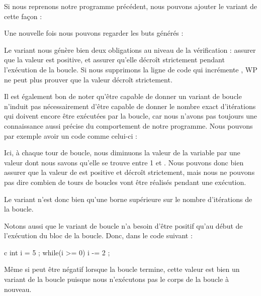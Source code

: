Si nous reprenons notre programme précédent, nous pouvons ajouter le variant
de cette façon :






Une nouvelle fois nous pouvons regarder les buts générés :





Le variant nous génère bien deux obligations au niveau de la vérification :
assurer que la valeur est positive, et assurer qu'elle décroît strictement pendant
l'exécution de la boucle. Si nous supprimons la ligne de code qui incrémente
, WP ne peut plus prouver que la valeur  décroît strictement.



Il est également bon de noter qu'être capable de donner un variant de boucle
n'induit pas nécessairement d'être capable de donner le nombre exact d'itérations
qui doivent encore être exécutées par la boucle, car nous n'avons pas toujours une
connaissance aussi précise du comportement de notre programme. Nous pouvons par
 exemple avoir un code comme celui-ci :






Ici, à chaque tour de boucle, nous diminuons la valeur de la variable  par une
valeur dont nous savons qu'elle se trouve entre 1 et . Nous pouvons donc bien
assurer que la valeur de  est positive et décroît strictement, mais nous ne
pouvons pas dire combien de tours de boucles vont être réalisés pendant une
exécution.


Le variant n'est donc bien qu'une borne supérieure sur le nombre d'itérations
de la boucle.


Notons aussi que le variant de boucle n'a besoin d'être positif qu'au début de l'exécution
du bloc de la boucle. Donc, dans le code suivant :


\begin{CodeBlock}{c}
int i = 5 ;
while(i >= 0){
  i -= 2 ;
}
\end{CodeBlock}


Même si  peut être négatif lorsque la boucle termine, cette valeur est
bien un variant de la boucle puisque nous n'exécutons pas le corps de la boucle à
nouveau.


